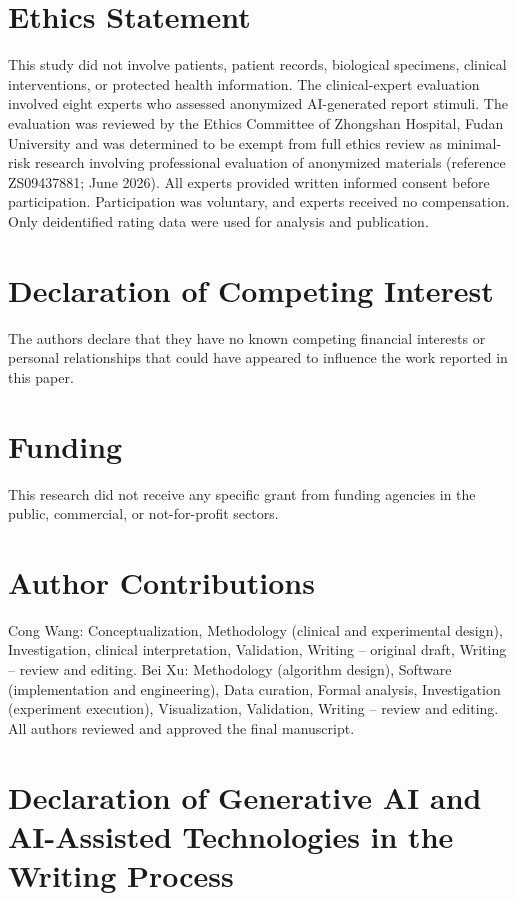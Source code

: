 \documentclass[11pt,a4paper]{article}
\begin{document}
\section*{Ethics Statement}

This study did not involve patients, patient records, biological specimens, clinical interventions, or protected health information. The clinical-expert evaluation involved eight experts who assessed anonymized AI-generated report stimuli. The evaluation was reviewed by the Ethics Committee of Zhongshan Hospital, Fudan University and was determined to be exempt from full ethics review as minimal-risk research involving professional evaluation of anonymized materials (reference ZS09437881; June 2026). All experts provided written informed consent before participation. Participation was voluntary, and experts received no compensation. Only deidentified rating data were used for analysis and publication.

\section*{Declaration of Competing Interest}

The authors declare that they have no known competing financial interests or personal relationships that could have appeared to influence the work reported in this paper.

\section*{Funding}

This research did not receive any specific grant from funding agencies in the public, commercial, or not-for-profit sectors.

\section*{Author Contributions}

Cong Wang: Conceptualization, Methodology (clinical and experimental design), Investigation, clinical interpretation, Validation, Writing -- original draft, Writing -- review and editing. Bei Xu: Methodology (algorithm design), Software (implementation and engineering), Data curation, Formal analysis, Investigation (experiment execution), Visualization, Validation, Writing -- review and editing. All authors reviewed and approved the final manuscript.

\section*{Declaration of Generative AI and AI-Assisted Technologies in the Writing Process}
\end{document}
